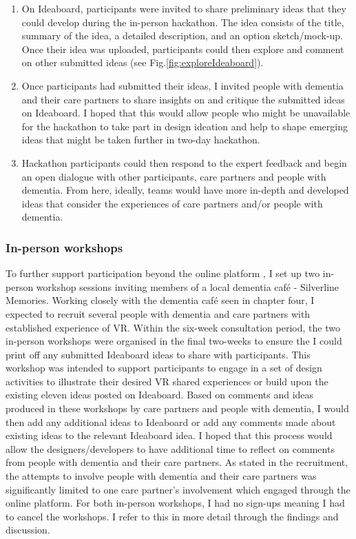 \begin{enumerate}
    \item On Ideaboard, participants were invited to share preliminary ideas that they could develop during the in-person hackathon. The idea consists of the title, summary of the idea, a detailed description, and an option sketch/mock-up. Once their idea was uploaded, participants could then explore and comment on other submitted ideas  (see Fig.\ref{fig:exploreIdeaboard}).
    
    \item Once participants had submitted their ideas, I invited people with dementia and their care partners to share insights on and critique the submitted ideas on Ideaboard. I hoped that this would allow people who might be unavailable for the hackathon to take part in design ideation and help to shape emerging ideas that might be taken further in two-day hackathon. 
    
    \item Hackathon participants could then respond to the expert feedback and begin an open dialogue with other participants, care partners and people with dementia. From here, ideally, teams would have more in-depth and developed ideas that consider the experiences of care partners and/or people with dementia. 
\end{enumerate}


\subsubsection{In-person workshops}
\label{sec:in-personWorkshops}

To further support participation beyond the online platform \citep{piper2016technological}, I set up two in-person workshop sessions inviting members of a local dementia café - Silverline Memories. Working closely with the dementia café seen in chapter four, I expected to recruit several people with dementia and care partners with established experience of VR. Within the six-week consultation period, the two in-person workshops were organised in the final two-weeks to ensure the I could print off any submitted Ideaboard ideas to share with participants.  This workshop was intended to support participants to engage in a set of design activities to illustrate their desired VR shared experiences or build upon the existing eleven ideas posted on Ideaboard. Based on comments and ideas produced in these workshops by care partners and people with dementia, I would then add any additional ideas to Ideaboard or add any comments made about existing ideas to the relevant Ideaboard idea. I hoped that this process would allow the designers/developers to have additional time to reflect on comments from people with dementia and their care partners. As stated in the recruitment, the attempts to involve people with dementia and their care partners was significantly limited to one care partner’s involvement which engaged through the online platform. For both in-person workshops, I had no sign-ups meaning I had to cancel the workshops. I refer to this in more detail through the findings and discussion.


